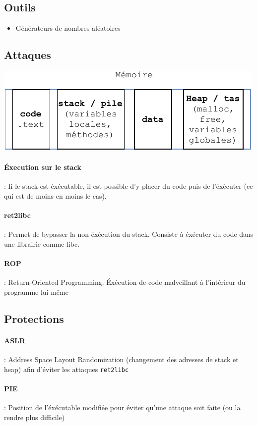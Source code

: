 \documentclass[resume]{subfiles}
\begin{document}
\subsection{Outils}
\begin{itemize}
\item Générateurs de nombres aléatoires
\end{itemize}
\subsection{Attaques}
\begin{center}
\includegraphics[scale=1,page=1]{Schemas-crop.pdf}
\end{center}
\paragraph{Éxecution sur le stack} : Ii le stack est éxécutable, il est possible d'y placer du code puis de l'éxécuter (ce qui est de moins en moins le cas).
\paragraph{ret2libc} : Permet de bypasser la non-éxécution du stack. Consiste à éxécuter du code dans une librairie comme libc.
\paragraph{ROP} : Return-Oriented Programming. Éxécution de code malveillant à l'intérieur du programme lui-même
\subsection{Protections}
\paragraph{ASLR} : Address Space Layout Randomization (changement des adresses de stack et heap) afin d'éviter les attaques \verb!ret2libc!
\paragraph{PIE} : Position de l'éxécutable modifiée pour éviter qu'une attaque soit faite (ou la rendre plus difficile)
\end{document}
